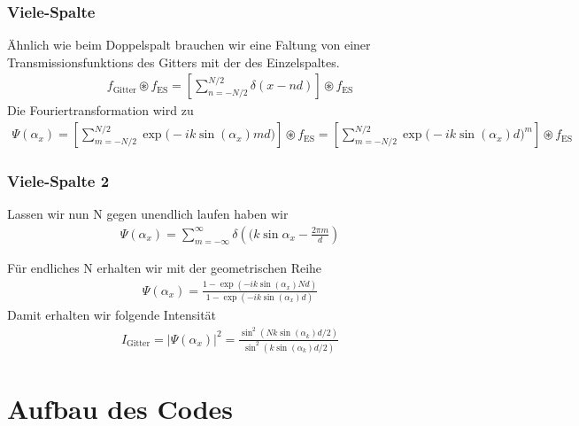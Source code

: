 \documentclass{beamer}
\begin{document}

\begin{frame}
  \frametitle{Viele-Spalte}

Ähnlich wie beim Doppelspalt brauchen wir eine Faltung von einer Transmissionsfunktions des Gitters mit der des Einzelspaltes.
\begin{align*}
f_\text{Gitter} \circledast f_\text{ES} = \left[\sum_{n=-N/2}^{N/2} \delta\left(x-nd\right)\right]  \circledast f_\text{ES}
\end{align*}
Die Fouriertransformation wird zu 
\begin{align*}
\Psi(\alpha_x) = \left[\sum_{m=-N/2}^{N/2}\exp\Big(-ik\sin(\alpha_x)md\Big)\right]  \circledast f_\text{ES} = \left[\sum_{m=-N/2}^{N/2}\exp\Big(-ik\sin(\alpha_x)d\Big)^m\right]  \circledast f_\text{ES}
\end{align*}

\end{frame}



\begin{frame}
  \frametitle{Viele-Spalte 2}

Lassen wir nun N gegen unendlich laufen haben wir 
\begin{align*}
\Psi(\alpha_x) = \sum_{m=-\infty}^\infty \delta \left((k\sin\alpha_x - \frac{2\pi m}{d}\right)
\end{align*}

Für endliches N erhalten wir mit der geometrischen Reihe
\begin{align*}
	\Psi(\alpha_x) = \frac{1- \exp(-ik \sin(\alpha_x)Nd)}{1-\exp(-ik\sin(\alpha_x)d)}
\end{align*}
Damit erhalten wir folgende Intensität
\begin{align*}
I_\text{Gitter} = |\Psi(\alpha_x)|^2 = \frac{\sin^2(Nk\sin(\alpha_k) d /2)}{\sin^2(k\sin(\alpha_k) d /2)}
\end{align*}

\end{frame}




\section{Aufbau des Codes}
\end{document}
